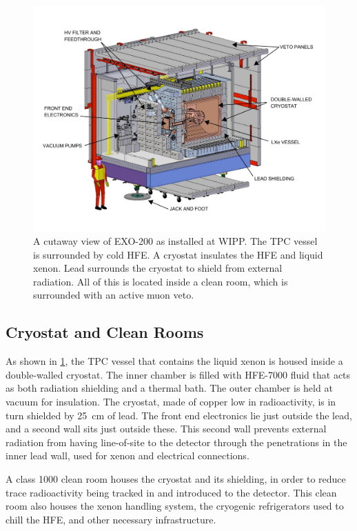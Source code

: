 \documentclass[herrin-thesis.tex]{subfiles}
\begin{document}
\begin{figure}
\centering
\includegraphics[width=1.0\textwidth]{./photos/detector_cleanroom.pdf}
\caption[Cutaway view of EXO-200 as installed]{A cutaway view of EXO-200 as installed at WIPP. The TPC vessel is surrounded by cold HFE. A cryostat insulates the HFE and liquid xenon. Lead surrounds the cryostat to shield from external radiation. All of this is located inside a clean room, which is surrounded with an active muon veto.}
\label{fig:detector_cleanroom}
\end{figure}

\subsection{Cryostat and Clean Rooms}
As shown in \cref{fig:detector_cleanroom}, the TPC vessel that contains the liquid xenon is housed inside a double-walled cryostat. The inner chamber is filled with HFE-7000 fluid that acts as both radiation shielding and a thermal bath. The outer chamber is held at vacuum for insulation. The cryostat, made of copper low in radioactivity, is in turn shielded by \SI{25}{\cm} of lead. The front end electronics lie just outside the lead, and a second wall sits just outside these. This second wall prevents external radiation from having line-of-site to the detector through the penetrations in the inner lead wall, used for xenon and electrical connections.

A class 1000 clean room houses the cryostat and its shielding, in order to reduce trace radioactivity being tracked in and introduced to the detector. This clean room also houses the xenon handling system, the cryogenic refrigerators used to chill the HFE, and other necessary infrastructure.
\end{document}
